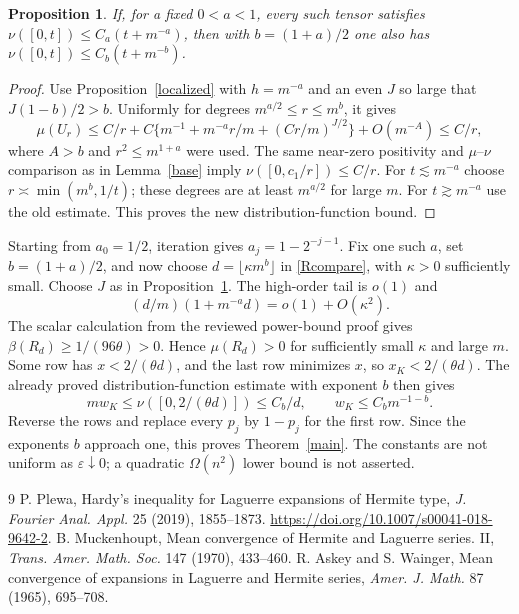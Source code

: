 \documentclass[11pt]{article}
\newtheorem{proposition}{Proposition}
\begin{document}
\begin{proposition}\label{step}
If, for a fixed $0<a<1$, every such tensor satisfies
$\nu([0,t])\le C_a(t+m^{-a})$, then with $b=(1+a)/2$ one also has
$\nu([0,t])\le C_b(t+m^{-b})$.
\end{proposition}
\begin{proof}
Use Proposition~\ref{localized} with $h=m^{-a}$ and an even $J$ so
large that $J(1-b)/2>b$. Uniformly for degrees
$m^{a/2}\le r\le m^b$, it gives
\[
 \mu(U_r)\le C/r+C\{m^{-1}+m^{-a}r/m+(Cr/m)^{J/2}\}
                 +O(m^{-A})\le C/r,
\]
where $A>b$ and $r^2\le m^{1+a}$ were used.
The same near-zero positivity and $\mu$--$\nu$ comparison as in
Lemma~\ref{base} imply $\nu([0,c_1/r])\le C/r$.
For $t\lesssim m^{-a}$ choose
$r\asymp\min(m^b,1/t)$; these degrees are at least $m^{a/2}$
for large $m$. For $t\gtrsim m^{-a}$ use the old estimate.
This proves the new distribution-function bound.
\end{proof}

Starting from $a_0=1/2$, iteration gives
$a_j=1-2^{-j-1}$. Fix one such $a$, set $b=(1+a)/2$, and now choose
$d=\lfloor\kappa m^b\rfloor$ in \eqref{Rcompare}, with $\kappa>0$
sufficiently small. Choose $J$ as in Proposition~\ref{step}.
The high-order tail is $o(1)$ and
\[
 (d/m)(1+m^{-a}d)=o(1)+O(\kappa^2).
\]
The scalar calculation from the reviewed power-bound proof gives
$\beta(R_d)\ge1/(96\theta)>0$. Hence $\mu(R_d)>0$ for sufficiently
small $\kappa$ and large $m$. Some row has $x<2/(\theta d)$, and
the last row minimizes $x$, so $x_K<2/(\theta d)$.
The already proved distribution-function estimate with exponent $b$
then gives
\[
 mw_K\le\nu([0,2/(\theta d)])\le C_b/d,
 \qquad w_K\le C_b m^{-1-b}.
\]
Reverse the rows and replace every $p_j$ by $1-p_j$ for the first row.
Since the exponents $b$ approach one, this proves Theorem~\ref{main}.
The constants are not uniform as $\varepsilon\downarrow0$; a quadratic
$\Omega(n^2)$ lower bound is not asserted.

\begin{thebibliography}{9}
 P. Plewa, Hardy's inequality for Laguerre expansions of
Hermite type, \emph{J. Fourier Anal. Appl.} 25 (2019), 1855--1873.
\url{https://doi.org/10.1007/s00041-018-9642-2}.
 B. Muckenhoupt, Mean convergence of Hermite and
Laguerre series. II, \emph{Trans. Amer. Math. Soc.} 147 (1970), 433--460.
 R. Askey and S. Wainger, Mean convergence of
expansions in Laguerre and Hermite series, \emph{Amer. J. Math.} 87
(1965), 695--708.
\end{thebibliography}
\end{document}
